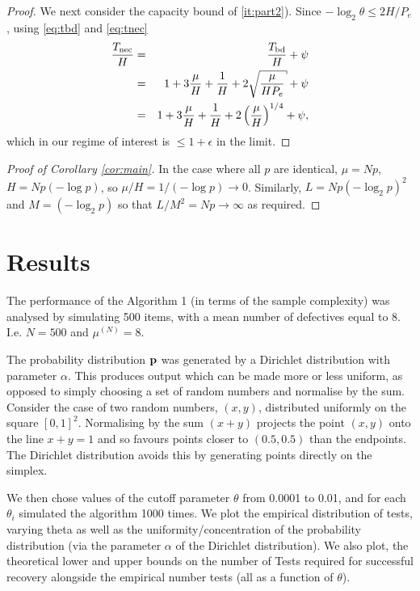 \begin{proof}
We next consider the capacity bound of \ref{it:part2}).
Since $-\log_2 \theta \leq 2 H/P_e$, using \eqref{eq:tbd}  and \eqref{eq:tnec}
\begin{eqnarray}
\frac{T_{\nec}}{H} & = & 
 \frac{T_{\bd}}{H}  + \psi \nonumber\\
&  = & 1 + 3 \frac{\mu}{H} + \frac{1}{H}  + 2 \sqrt{ \frac{ \mu}{H P_e}} + \psi \nonumber \\
& =  & 1 + 3 \frac{\mu}{H} + \frac{1}{H} + 2 \left( \frac{\mu}{H} \right)^{1/4} + \psi, \label{eq:ratio2}
\end{eqnarray}
which in our regime of interest is $\leq 1 + \epsilon$ in the limit.
\end{proof}

\begin{proof}[Proof of Corollary \ref{cor:main}]
In the case where all $p$ are identical, $\mu = N p$, $H  = N p (-\log p)$, so $\mu/H = 1/(-\log p) \rightarrow 0$. Similarly, $L = N p (-\log_2 p)^2$ and $M = ( -\log_2 p)$
so that $L/M^2 = N p \rightarrow \infty$ as required.
\end{proof}









\section{Results}
The performance of the Algorithm 1 (in terms of the sample complexity) was analysed by simulating 500 items, with a mean number of defectives equal to 8. I.e. \(N = 500\) and \(\mu^{(N)} = 8\). 

The probability distribution \({\mathbf{ p}}\) was generated by a Dirichlet distribution with parameter $\alpha$.
This produces  output which can be made more or less uniform, as opposed to
 simply choosing a set of random numbers and normalise by the sum. Consider the case of two random numbers, \(\left(x,y\right)\), distributed uniformly on the square \(\left[0,1\right]^2\). Normalising by the sum \(\left(x+y\right)\) projects the point \(\left(x,y\right)\) onto the line \(x+y=1\) and so favours points closer to \((0.5,0.5)\) than the endpoints. The Dirichlet distribution avoids this by generating points directly on the simplex.

We then chose values of the cutoff parameter \(\theta\) from 0.0001 to 0.01, and for each \(\theta_i\) simulated the algorithm 1000 times. We plot the empirical distribution of tests, varying theta as well as the uniformity/concentration of the probability distribution (via the parameter \(\alpha\) of the Dirichlet distribution). We also plot, the theoretical lower and upper bounds on the number of Tests required for successful recovery alongside the empirical number tests (all as a function of \(\theta\)).

